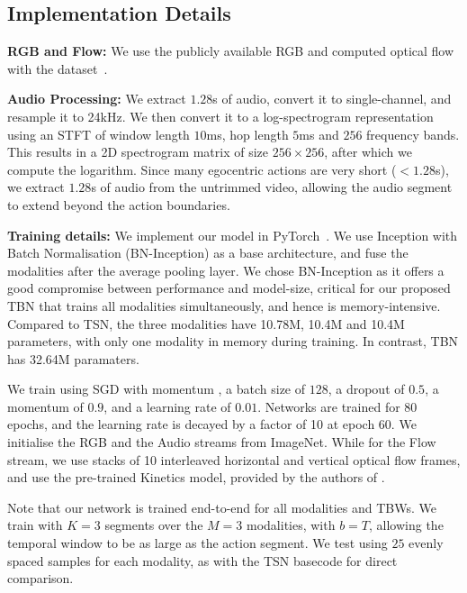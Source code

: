 \documentclass[10pt,twocolumn,letterpaper]{article}
\begin{document}
\subsection{Implementation Details}\label{sec:implementation}
\noindent\textbf{RGB and Flow:} We use the publicly available RGB and computed optical flow with the dataset~\cite{Damen_2018_ECCV}. 

\noindent\textbf{Audio Processing:} We extract $1.28$s of audio, convert it to single-channel, and resample it to 24kHz. We then convert it to a log-spectrogram representation using an STFT of window length $10$ms, hop length $5$ms and
$256$ frequency bands. This results in a 2D spectrogram matrix of size $256\times256$, after which we compute the logarithm. Since many egocentric actions are very short ($<1.28$s),
we extract $1.28$s of audio from the untrimmed video, allowing the audio segment to extend beyond the action boundaries.


\noindent\textbf{Training details:}
We implement our model in PyTorch~\cite{paszke2017automatic}. 
We use Inception with Batch Normalisation (BN-Inception) \cite{pmlr-v37-ioffe15} as a
base architecture, and fuse the modalities after the average pooling layer. 
We chose BN-Inception as it offers a good compromise between performance and model-size, critical
for our proposed TBN that trains all modalities simultaneously, and hence is memory-intensive. Compared to TSN, the three modalities have 10.78M, 10.4M and 10.4M parameters, with only one modality in memory during training. In contrast, 
TBN has 32.64M paramaters.

We train using SGD with momentum \cite{Qian:1999}, a batch size of $128$, a dropout of $0.5$, 
a momentum of $0.9$, and a learning rate of $0.01$. Networks are trained for $80$ epochs, and the learning
rate is decayed by a factor of 10 at epoch $60$. 
We initialise the RGB and the Audio streams from ImageNet. While for the Flow stream, we use stacks of 10 interleaved horizontal and vertical optical flow frames, and use the pre-trained Kinetics \cite{Carreira_2017_CVPR} model, provided by the authors of \cite{TSN2016ECCV}. 

Note that our network is trained end-to-end for all modalities and TBWs. 
We train with $K=3$ segments over the $M=3$ modalities, with $b = T$, allowing the temporal window to be as large as the action segment.
We test using $25$ evenly spaced samples for each modality, as with the TSN basecode for direct comparison.
\end{document}
